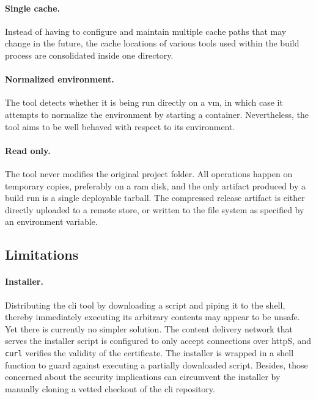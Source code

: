 \paragraph{Single cache.}  Instead of having to configure and maintain multiple cache paths that may change in the future, the cache locations of various tools used within the build process are consolidated inside one directory.

\paragraph{Normalized environment.} The tool detects whether it is being run directly on a \acrshort{vm}, in which case it attempts to normalize the environment by starting a container. Nevertheless, the tool aims to be well behaved with respect to its environment.

\paragraph{Read only.} The tool never modifies the original project folder. All operations happen on temporary copies, preferably on a \acrshort{ram} disk, and the only artifact produced by a build run is a single deployable tarball. The compressed release artifact is either directly uploaded to a remote store, or written to the file system as specified by an environment variable.

\cleardoublepage
\subsection{Limitations}

\paragraph{Installer.}\label{sec:curlpipesh} Distributing the \acrshort{cli} tool by downloading a script and piping it to the shell, thereby immediately executing its arbitrary contents may appear to be unsafe. Yet there is currently no simpler solution. The content delivery network that serves the installer script is configured to only accept connections over \acrshort{http}S, and \lstinline|curl| verifies the validity of the certificate. The installer is wrapped in a shell function to guard against executing a partially downloaded script. Besides, those concerned about the security implications can circumvent the installer by manually cloning a vetted checkout of the \acrshort{cli} repository.

